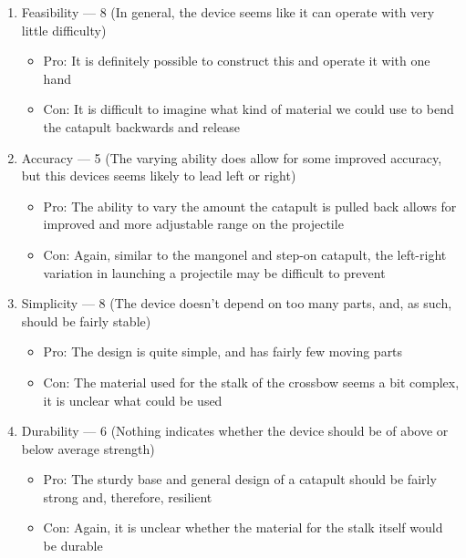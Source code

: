 \begin{enumerate}

  \item Feasibility — 8 (In general, the device seems like it can operate with very little difficulty)

    \begin{itemize}

      \item Pro: It is definitely possible to construct this and operate it with one hand

      \item Con: It is difficult to imagine what kind of material we could use to bend the catapult backwards and release

    \end{itemize}

  \item Accuracy — 5 (The varying ability does allow for some improved accuracy, but this devices seems likely to lead left or right)

    \begin{itemize}

      \item Pro: The ability to vary the amount the catapult is pulled back allows for improved and more adjustable range on the projectile

      \item Con: Again, similar to the mangonel and step-on catapult, the left-right variation in launching a projectile may be difficult to prevent

    \end{itemize}

  \item Simplicity — 8 (The device doesn't depend on too many parts, and, as such, should be fairly stable)

    \begin{itemize}

      \item Pro: The design is quite simple, and has fairly few moving parts

      \item Con: The material used for the stalk of the crossbow seems a bit complex, it is unclear what could be used

    \end{itemize}

  \item Durability — 6 (Nothing indicates whether the device should be of above or below average strength)

    \begin{itemize}

      \item Pro: The sturdy base and general design of a catapult should be fairly strong and, therefore, resilient

      \item Con: Again, it is unclear whether the material for the stalk itself would be durable

    \end{itemize}

\end{enumerate}


